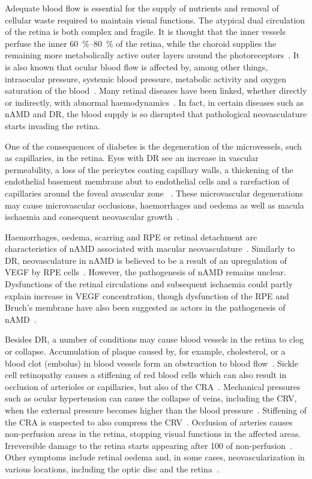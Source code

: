 \documentclass{article}
\begin{document}
Adequate blood flow is essential for the supply of nutrients and removal of cellular waste required to maintain visual functions.
The atypical dual circulation of the retina is both complex and fragile.
It is thought that the inner vessels perfuse the inner \SIrange{60}{80}{\percent} of the retina, while the choroid supplies the remaining more metabolically active outer layers around the photoreceptors~\cite{Birol_2007}.
It is also known that ocular blood flow is affected by, among other things, intraocular pressure, systemic blood pressure, metabolic activity and oxygen saturation of the blood~\cite{Birol_2007,McCullough_1997,Palkovits_2014,Polska_2007,Pournaras_2008,Riva_1997,Wang_2014}.
Many retinal diseases have been linked, whether directly or indirectly, with abnormal haemodynamics~\cite{Hayreh_2004,Medina_2016}.
In fact, in certain diseases such as nAMD and DR, the blood supply is so disrupted that pathological neovasculature starts invading the retina.

One of the consequences of diabetes is the degeneration of the microvessels, such as capillaries, in the retina.
Eyes with DR see an increase in vascular permeability, a loss of the pericytes coating capillary walls, a thickening of the endothelial basement membrane abut to endothelial cells and a rarefaction of capillaries around the foveal avascular zone ~\cite{Medina_2016}.
These microvascular degenerations may cause microvascular occlusions, haemorrhages and oedema as well as macula ischaemia and consequent neovascular growth~\cite{Medina_2016}.

Haemorrhages, oedema, scarring and RPE or retinal detachment are characteristics of nAMD associated with macular neovasculature~\cite{Gupta_2015,Jager_2008}.
Similarly to DR, neovasculature in nAMD is believed to be a result of an upregulation of VEGF by RPE cells~\cite{Jager_2008}.
However, the pathogenesis of nAMD remains unclear.
Dysfunctions of the retinal circulations and subsequent ischaemia could partly explain increase in VEGF concentration, though dysfunction of the RPE and Bruch's membrane have also been suggested as actors in the pathogenesis of nAMD~\cite{Ambati_and_Fowler_2012,Pemp_2008,Liu_1995}.

Besides DR, a number of conditions may cause blood vessels in the retina to clog or collapse.
Accumulation of plaque caused by, for example, cholesterol, or a blood clot (embolus) in blood vessels form an obstruction to blood flow~\cite{Medina_2016}.
Sickle cell retinopathy causes a stiffening of red blood cells which can also result in occlusion of arterioles or capillaries, but also of the CRA~\cite{Medina_2016}.
Mechanical pressures such as ocular hypertension can cause the collapse of veins, including the CRV, when the external pressure becomes higher than the blood pressure~\cite{Hayreh_2004}.
Stiffening of the CRA is suspected to also compress the CRV~\cite{Medina_2016}.
Occlusion of arteries causes non-perfusion areas in the retina, stopping visual functions in the affected areas.
Irreversible damage to the retina starts appearing after \SI{100}{\min} of non-perfusion~\cite{Hayreh_2004}.
Other symptoms include retinal oedema and, in some cases, neovascularization in various locations, including the optic disc and the retina~\cite{Medina_2016}.
\end{document}
